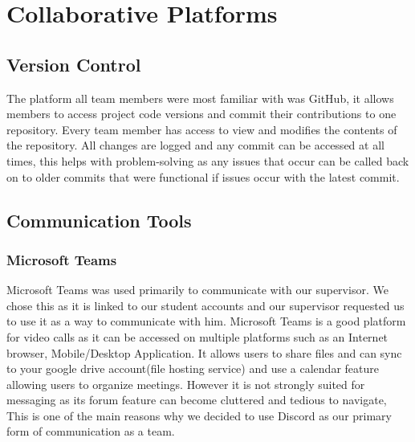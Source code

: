 \section{Collaborative Platforms}
\subsection{Version Control}
The platform all team members were most familiar with was GitHub, it allows members to access project code versions and commit their contributions to one repository. Every team member has access to view and modifies the contents of the repository. All changes are logged and any commit can be accessed at all times, this helps with problem-solving as any issues that occur can be called back on to older commits that were functional if issues occur with the latest commit.

\subsection{Communication Tools}
\subsubsection{Microsoft Teams}
Microsoft Teams was used primarily to communicate with our supervisor. We chose this as it is linked to our student accounts and our supervisor requested us to use it as a way to communicate with him.
\newline 
\newline 
Microsoft Teams is a good platform for video calls as it can be accessed on multiple platforms such as an Internet browser, Mobile/Desktop Application. It allows users to share files and can sync to your google drive account(file hosting service) and use a calendar feature allowing users to organize meetings.
\newline
\newline 
However it is not strongly suited for messaging as its forum feature can become cluttered and tedious to navigate, This is one of the main reasons why we decided to use Discord as our primary form of communication as a team.

